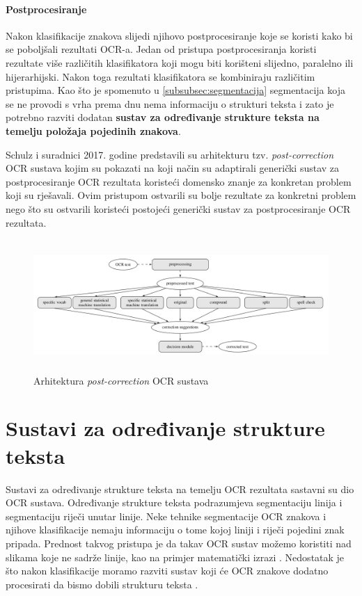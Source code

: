 \documentclass[times, utf8, zavrsni]{fer}
\begin{document}
\subsubsection{Postprocesiranje}

Nakon klasifikacije znakova slijedi njihovo postprocesiranje koje se koristi kako
bi se poboljšali rezultati OCR-a. Jedan od pristupa postprocesiranja koristi rezultate
više različitih klasifikatora koji mogu biti korišteni slijedno, paralelno ili hijerarhijski.
Nakon toga rezultati klasifikatora se kombiniraju različitim pristupima. \citep{DBLP:journals/corr/abs-1710-05703}
Kao što je spomenuto u \ref{subsubsec:segmentacija} segmentacija koja se ne provodi s vrha prema
dnu nema informaciju o strukturi teksta i zato je potrebno razviti dodatan
\textbf{sustav za određivanje strukture teksta na temelju položaja pojedinih znakova}.

Schulz i suradnici \citep{schulz2017multi} 2017. godine predstavili su arhitekturu
tzv. \emph{post-correction} OCR sustava kojim su pokazati na koji način su
adaptirali generički sustav za postprocesiranje OCR rezultata koristeći domensko znanje
za konkretan problem koji su rješavali. Ovim pristupom ostvarili su bolje rezultate
za konkretni problem nego što su ostvarili koristeći postojeći generički sustav za
postprocesiranje OCR rezultata.

\begin{figure}[htb]
    \centering
    \includegraphics[height=5cm]{images/post-correction-example-01.png}
    \caption{Arhitektura \emph{post-correction} OCR sustava \citep{schulz2017multi}}
    \label{fig:post-correction-example-01}
\end{figure}

\chapter{Sustavi za određivanje strukture teksta}
Sustavi za određivanje strukture teksta na temelju OCR rezultata sastavni su dio OCR sustava. Određivanje strukture teksta
podrazumjeva segmentaciju linija i segmentaciju riječi unutar linije. Neke tehnike segmentacije
OCR znakova i njihove klasifikacije nemaju informaciju o tome kojoj liniji i riječi pojedini znak pripada.
Prednost takvog pristupa je da takav OCR sustav možemo koristiti nad slikama koje ne sadrže linije,
kao na primjer matematički izrazi \citep{Jurin:2017:Master}. Nedostatak je što nakon klasifikacije
moramo razviti sustav koji će OCR znakove dodatno procesirati da bismo dobili strukturu teksta \citep{Jurin:2017:Master}.
\end{document}
